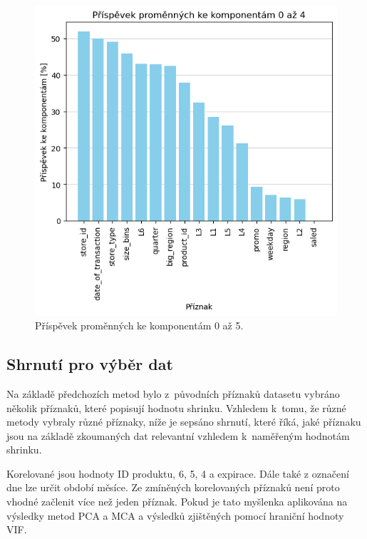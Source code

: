 \begin{figure}[h!]
    \centering
    \includegraphics[width=.8\textwidth]{obrazky/pripravadat/mca-prispevky.png}
    \caption{Příspěvek proměnných ke komponentám 0 až 5.}
    \label{obr:nb:mca_prispevek}
\end{figure}



\subsection*{Shrnutí pro výběr dat}

Na základě předchozích metod bylo z~původních příznaků datasetu 
vybráno několik příznaků, které popisují hodnotu shrinku.
Vzhledem k~tomu, že různé metody vybraly různé příznaky, níže je sepsáno shrnutí, které říká, jaké příznaku jsou na základě zkoumaných dat relevantní vzhledem k~naměřeným hodnotám shrinku. 

Korelované jsou hodnoty ID produktu, 6, 5, 4 a expirace. Dále také z označení dne lze určit období měsíce. Ze zmíněných korelovaných příznaků není proto vhodné začlenit více než jeden příznak. Pokud je tato myšlenka aplikována na výsledky metod PCA a MCA a výsledků zjištěných pomocí hraniční hodnoty VIF.

